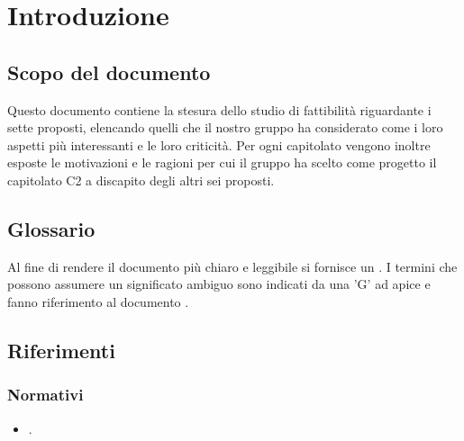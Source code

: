 \section{Introduzione}\label{Introduzione}
\subsection{Scopo del documento}
Questo documento contiene la stesura dello studio di fattibilità riguardante i sette  proposti, elencando quelli che il nostro gruppo ha considerato come i loro aspetti più interessanti e le loro criticità. Per ogni capitolato vengono inoltre esposte le motivazioni e le ragioni per cui il gruppo ha scelto come progetto il capitolato C2 \NomeProgetto{} a discapito degli altri sei proposti.

\subsection{Glossario} \label{Glossario}
Al fine di rendere il documento più chiaro e leggibile si fornisce un \Glossario{}. I termini che possono assumere un significato ambiguo sono indicati da una 'G' ad apice e fanno riferimento al documento .

\subsection{Riferimenti}
\subsubsection{Normativi}
\begin{itemize}
\item {}.
\end{itemize}


